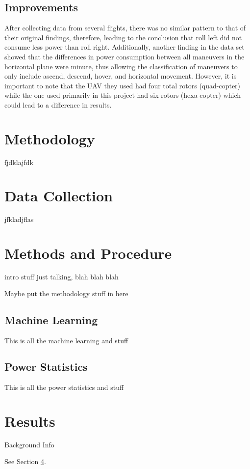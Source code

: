 \documentclass{article}
\begin{document}
\subsection{Improvements}
After collecting data from several flights, there was no similar pattern to that of their original findings, therefore, leading to the conclusion that roll left did not consume less power than roll right. Additionally, another finding in the data set showed that the differences in power consumption between all maneuvers in the horizontal plane were minute, thus allowing the classification of maneuvers to only include ascend, descend, hover, and horizontal movement. However, it is important to note that the UAV they used had four total rotors (quad-copter) while the one used primarily in this project had six rotors (hexa-copter) which could lead to a difference in results.


\section{Methodology}
fjdklajfdk


\section{Data Collection}
jfkladjflas


\section{Methods and Procedure}
intro stuff just talking, blah blah blah\par

Maybe put the methodology stuff in here


\subsection{Machine Learning}
This is all the machine learning and stuff


\subsection{Power Statistics}
This is all the power statistics and stuff


\section{Results}
\label{sec:headings}

Background Info \par
See Section \ref{sec:headings}.
\end{document}

